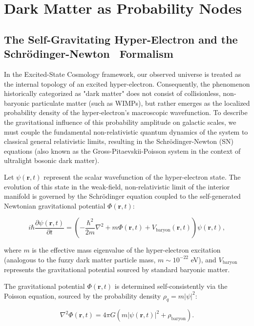 \section{Dark Matter as Probability Nodes}

\subsection{The Self-Gravitating Hyper-Electron and the Schrödinger-Newton~\cite{Hu2000} Formalism}

In the Excited-State Cosmology framework, our observed universe is treated as the internal topology of an excited hyper-electron. Consequently, the phenomenon historically categorized as "dark matter" does not consist of collisionless, non-baryonic particulate matter (such as WIMPs), but rather emerges as the localized probability density of the hyper-electron's macroscopic wavefunction. To describe the gravitational influence of this probability amplitude on galactic scales, we must couple the fundamental non-relativistic quantum dynamics of the system to classical general relativistic limits, resulting in the Schrödinger-Newton (SN) equations (also known as the Gross-Pitaevskii-Poisson system in the context of ultralight bosonic dark matter). \cite{Hinshaw2013, Lemaitre1927, Witten1998}

Let $\psi(\mathbf{r}, t)$ represent the scalar wavefunction of the hyper-electron state. The evolution of this state in the weak-field, non-relativistic limit of the interior manifold is governed by the Schrödinger equation coupled to the self-generated Newtonian gravitational potential $\Phi(\mathbf{r},t)$:

\begin{equation}
i \hbar \frac{\partial \psi(\mathbf{r},t)}{\partial t} = \left( -\frac{\hbar^2}{2m} \nabla^2 + m \Phi(\mathbf{r},t) + V_{\text{baryon}}(\mathbf{r},t) \right) \psi(\mathbf{r},t),
\label{eq:schrodinger}
\end{equation}

where $m$ is the effective mass eigenvalue of the hyper-electron excitation (analogous to the fuzzy dark matter particle mass, $m \sim 10^{-22}$ eV), and $V_{\text{baryon}}$ represents the gravitational potential sourced by standard baryonic matter.

The gravitational potential $\Phi(\mathbf{r},t)$ is determined self-consistently via the Poisson equation, sourced by the probability density $\rho_q = m|\psi|^2$:

\begin{equation}
\nabla^2 \Phi(\mathbf{r},t) = 4 \pi G \left( m |\psi(\mathbf{r},t)|^2 + \rho_{\text{baryon}} \right).
\label{eq:poisson}
\end{equation}

